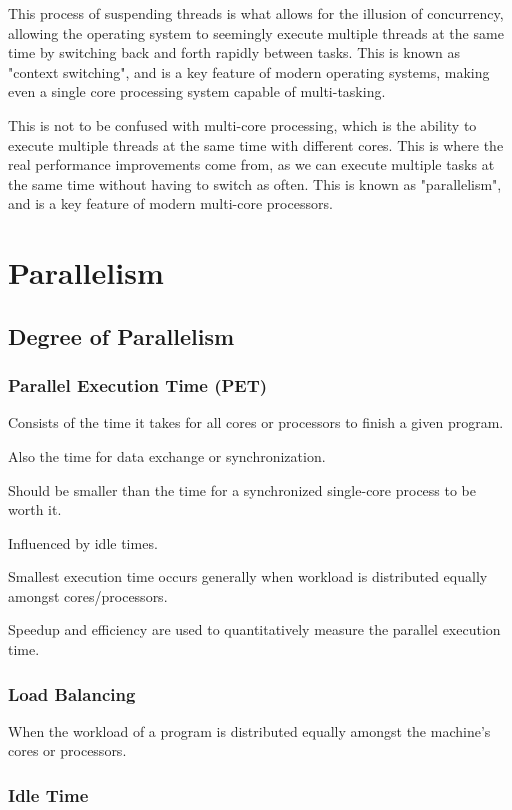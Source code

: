 \documentclass{article}
\begin{document}
This process of suspending threads is what allows for the illusion of concurrency, allowing the operating system to seemingly execute multiple threads at the same time by switching back and forth rapidly between tasks. This is known as "context switching", and is a key feature of modern operating systems, making even a single core processing system capable of multi-tasking.

This is not to be confused with multi-core processing, which is the ability to execute multiple threads at the same time with different cores. This is where the real performance improvements come from, as we can execute multiple tasks at the same time without having to switch as often. This is known as "parallelism", and is a key feature of modern multi-core processors.

\section{Parallelism}
\subsection{Degree of Parallelism}
\subsubsection{Parallel Execution Time (PET)}

Consists of the time it takes for all cores or processors to finish a given program.

Also the time for data exchange or synchronization.

Should be smaller than the time for a synchronized single-core process to be worth it.

Influenced by idle times.

Smallest execution time occurs generally when workload is distributed equally amongst cores/processors.

Speedup and efficiency are used to quantitatively measure the parallel execution time.

\subsubsection{Load Balancing}

When the workload of a program is distributed equally amongst the machine's cores or processors.

\subsubsection{Idle Time}
\end{document}

